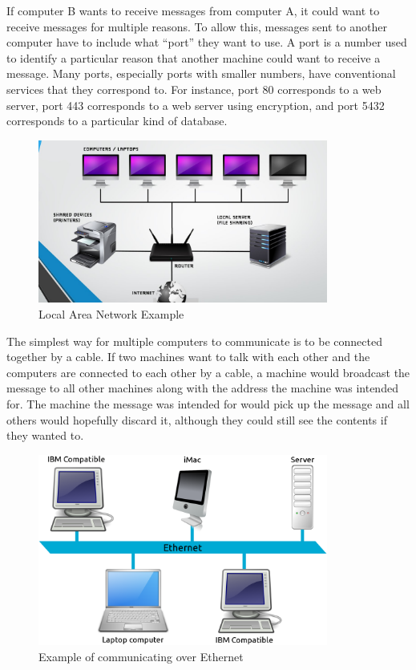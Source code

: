If computer B wants to receive messages from computer A, it could want to receive messages for multiple reasons. To allow this, messages sent to another computer have to include what “port” they want to use. A port is a number used to identify a particular reason that another machine could want to receive a message. Many ports, especially ports with smaller numbers, have conventional services that they correspond to. For instance, port 80 corresponds to a web server, port 443 corresponds to a web server using encryption, and port 5432 corresponds to a particular kind of database.

\begin{figure}
	\centering
	\includegraphics[width=0.85\textwidth]{images/lanExample.png}
	\caption{Local Area Network Example}
	\label{fig:windows:file}
\end{figure}

The simplest way for multiple computers to communicate is to be connected together by a cable. If two machines want to talk with each other and the computers are connected to each other by a cable, a machine would broadcast the message to all other machines along with the address the machine was intended for. The machine the message was intended for would pick up the message and all others would hopefully discard it, although they could still see the contents if they wanted to.

\begin{figure}
	\centering
	\includegraphics[width=0.85\textwidth]{images/ethernetExample.png}
	\caption{Example of communicating over Ethernet}
	\label{fig:windows:file}
\end{figure}

